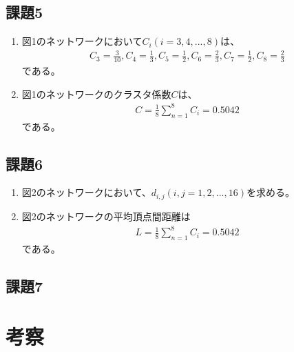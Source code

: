 \documentclass[12pt]{jarticle}
\begin{document}
\clearpage
\subsection{課題5}
\begin{enumerate}
    \item 図1のネットワークにおいて$C_i(i=3,4,...,8)$は、
          \begin{eqnarray*}
              C_3=\frac{3}{10}, C_4=\frac{1}{3}, C_5=\frac{1}{2}, C_6=\frac{2}{3}, C_7=\frac{1}{2}, C_8=\frac{2}{3}
          \end{eqnarray*}
          である。
    \item 図1のネットワークのクラスタ係数$C$は、
          \begin{eqnarray*}
              C=\frac{1}{8} \sum_{n = 1}^{8} C_i =0.5042
          \end{eqnarray*}
          である。
\end{enumerate}

\subsection{課題6}
\begin{enumerate}
    \item 図2のネットワークにおいて、$d_{i,j}(i,j=1,2,...,16)$を求める。
    \item 図2のネットワークの平均頂点間距離は
          \begin{eqnarray*}
              L=\frac{1}{8} \sum_{n = 1}^{8} C_i =0.5042
          \end{eqnarray*}
          である。
\end{enumerate}

\subsection{課題7}
\clearpage




\section{考察}


\clearpage
\appendix

\end{document}
